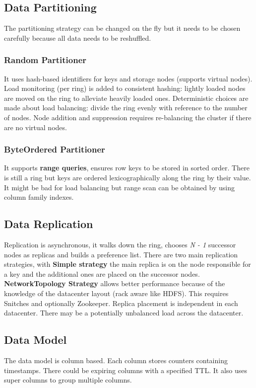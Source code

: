 	\subsection{Data Partitioning}
	The partitioning strategy can be changed on the fly but it needs to be chosen carefully because all data needs to be reshuffled.
		\subsubsection{Random Partitioner}
		It uses hash-based identifiers for keys and storage nodes (supports virtual nodes). Load monitoring (per ring) is added to consistent hashing: lightly loaded nodes are moved on the ring to alleviate heavily loaded ones. Deterministic choices are made about load balancing: divide the ring evenly with reference to the number of nodes.\newline
		Node addition and suppression requires re-balancing the cluster if there are no virtual nodes.
		\subsubsection{ByteOrdered Partitioner}
		It supports \textbf{range queries}, ensures row keys to be stored in sorted order. There is still a ring but keys are ordered lexicographically along the ring by their value. It might be bad for load balancing but range scan can be obtained by using column family indexes.
	\subsection{Data Replication}
	Replication is asynchronous, it walks down the ring, chooses \textit{N - 1} successor nodes as replicas and builds a preference list.\newline
	There are two main replication strategies, with \textbf{Simple strategy} the main replica is on the node responsible for a key and the additional ones are placed on the successor nodes. \textbf{NetworkTopology Strategy} allows better performance because of the knowledge of the datacenter layout (rack aware like HDFS). This requires Snitches  and optionally Zookeeper. Replica placement is independent in each datacenter.\newline
	There may be a potentially unbalanced load across the datacenter.
	\subsection{Data Model}
	The data model is column based. Each column stores counters containing timestamps. There could be expiring columns with a specified TTL. It also uses super columns to group multiple columns.
